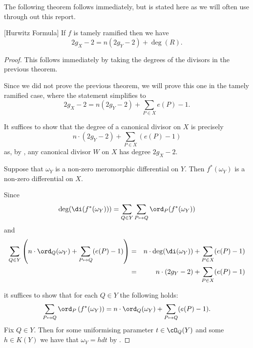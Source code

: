 The following theorem follows immediately, but is stated here as we will often use through out this report.\\

\begin{thm}\label{hur}[Hurwitz Formula]
	If $f$ is tamely ramified then we have
		\begin{equation*}
			2g_{X}-2=n(2g_{Y}-2)+\deg(R).
		\end{equation*}
\end{thm}

\begin{proof}
	This follows immediately by taking the degrees of the divisors in the previous theorem.


	Since we did not prove the previous theorem, we will prove this one in the tamely ramified case, where the statement simplifies to
		\[
			2g_X-2 = n(2g_Y-2) + \sum_{P\in X} e(P)-1.
		\]

	It suffices to show that the degree of a canonical divisor on $X$ is precisely 
		\begin{equation*}
			n\cdot (2g_{Y}-2)+\sum_{P\in X}(e(P)-1)
		\end{equation*}
	as, by \cite[Cor, pg.107]{fulton}, any canonical divisor $W$ on $X$ has degree $2g_X-2$.

	Suppose that $\omega_{Y}$ is a non-zero meromorphic differential on $Y$.
	Then $f^*(\omega_{Y})$ is a non-zero differential on $X$.

	
	Since
		\begin{equation*}
			\deg(\di(f^*(\omega_{Y}))) = \sum_{Q\in Y} \sum_{P\mapsto Q} \ord_{P}(f^*(\omega_{Y}))
		\end{equation*}
	and
		\begin{eqnarray*}
			\sum_{Q\in Y} \left(n\cdot \ord_{Q}(\omega_{Y}) +\sum_{P\mapsto Q}(e(P)-1)\right)
			& = & n\cdot \deg(\di(\omega_{Y})) +\sum_{P\in X} (e(P)-1) \\
			& = & n\cdot (2g_{Y}-2) + \sum_{P\in X}(e(P)-1)
		\end{eqnarray*}
	
	it suffices to show that for each $Q\in Y$ the following holds:
		\begin{equation*}
			\sum_{P\mapsto Q}\ord_{P}\left(f^*(\omega_{Y})\right)=n\cdot \ord_{Q}(\omega_{Y})+\sum_{P\mapsto Q}(e(P)-1).
		\end{equation*}
	Fix $Q\in Y$.
	Then for some uniformising parameter $t\in \cO_{Q}(Y)$ and some $h\in K(Y)$ we have that $\omega_{Y}=hdt$ by \cite[Prop 6, pg. 105]{fulton}.


\end{proof}

